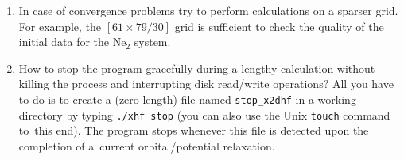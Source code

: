 \documentclass[12pt,a4paper]{article}
\begin{document}
\begin{enumerate}
\item In case of convergence problems try to perform calculations on a
  sparser grid. For example, the $[61\times 79/30]$ grid is
  sufficient to check the quality of the initial data for the Ne$_2$
  system.

\item \label{section:hints} How to stop the program gracefully during
  a lengthy calculation without killing the process and interrupting
  disk read/write operations?  All you have to do is to create a (zero
  length) file named \texttt{stop\_x2dhf} in a working directory by
  typing \texttt{./xhf stop} (you can also use the Unix \texttt{touch}
  command to~this end). The program stops whenever this file is
  detected upon the completion of a~current orbital/potential
  relaxation.



\end{enumerate}
\end{document}
